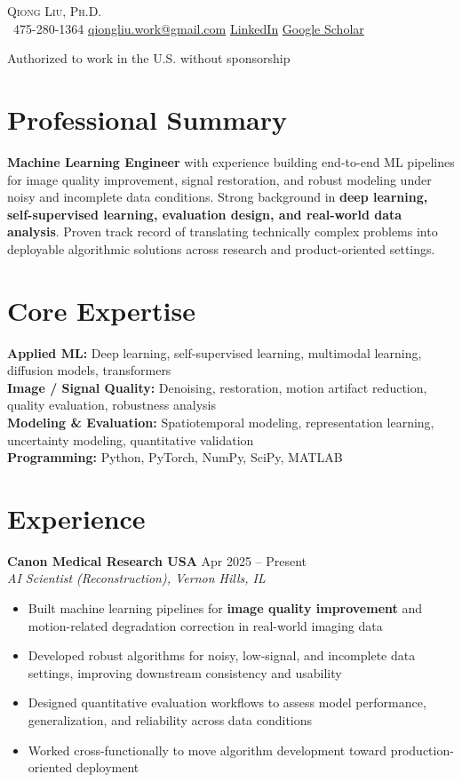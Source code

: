 \begin{center}
{\Huge \scshape Qiong Liu, Ph.D.} \\ \vspace{4pt}
\small
\faPhone\ 475-280-1364 \quad
\href{mailto:qiongliu.work@gmail.com}{qiongliu.work@gmail.com} \quad
\href{https://www.linkedin.com/in/qiong-l-529b23196}{LinkedIn} \quad
\href{https://scholar.google.com/citations?user=SvnpHCkAAAAJ&hl=en}{Google Scholar}

Authorized to work in the U.S. without sponsorship
\end{center}

\section{Professional Summary}
\textbf{Machine Learning Engineer} with experience building end-to-end ML pipelines for image quality improvement, signal restoration, and robust modeling under noisy and incomplete data conditions. Strong background in \textbf{deep learning, self-supervised learning, evaluation design, and real-world data analysis}. Proven track record of translating technically complex problems into deployable algorithmic solutions across research and product-oriented settings.

\section{Core Expertise}
\textbf{Applied ML:} Deep learning, self-supervised learning, multimodal learning, diffusion models, transformers \\
\textbf{Image / Signal Quality:} Denoising, restoration, motion artifact reduction, quality evaluation, robustness analysis \\
\textbf{Modeling \& Evaluation:} Spatiotemporal modeling, representation learning, uncertainty modeling, quantitative validation \\
\textbf{Programming:} Python, PyTorch, NumPy, SciPy, MATLAB

\section{Experience}
\textbf{Canon Medical Research USA} \hfill Apr 2025 -- Present \\
\textit{AI Scientist (Reconstruction), Vernon Hills, IL}
\begin{itemize}[leftmargin=*]
\item Built machine learning pipelines for \textbf{image quality improvement} and motion-related degradation correction in real-world imaging data
\item Developed robust algorithms for noisy, low-signal, and incomplete data settings, improving downstream consistency and usability
\item Designed quantitative evaluation workflows to assess model performance, generalization, and reliability across data conditions
\item Worked cross-functionally to move algorithm development toward production-oriented deployment
\end{itemize}

